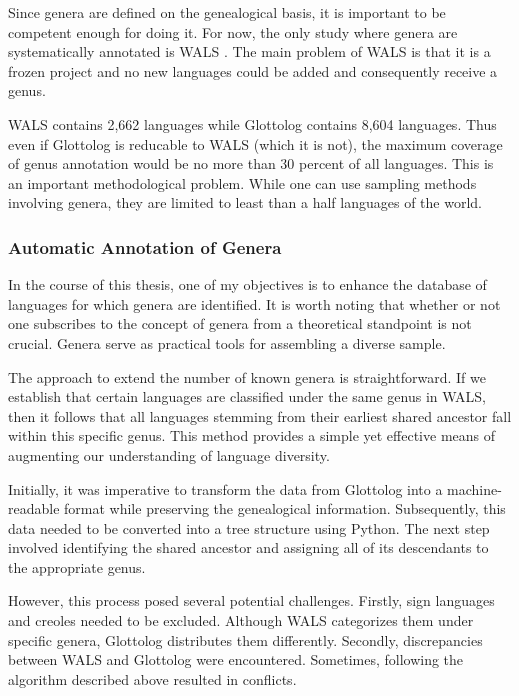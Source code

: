 Since genera are defined on the genealogical basis, it is important to be competent enough for doing it. For now, the only study where genera are systematically annotated is WALS \citep{wals}. The main problem of WALS is that it is a frozen project and no new languages could be added and consequently receive a genus.

WALS contains 2,662 languages while Glottolog \citep{hammarstrom2014glottolog} contains 8,604 languages. Thus even if Glottolog is reducable to WALS (which it is not), the maximum coverage of genus annotation would be no more than 30 percent of all languages. This is an important methodological problem. While one can use sampling methods involving genera, they are limited to least than a half languages of the world.

\subsubsection{Automatic Annotation of Genera}

In the course of this thesis, one of my objectives is to enhance the database of languages for which genera are identified. It is worth noting that whether or not one subscribes to the concept of genera from a theoretical standpoint is not crucial. Genera serve as practical tools for assembling a diverse sample.

The approach to extend the number of known genera is straightforward. If we establish that certain languages are classified under the same genus in WALS, then it follows that all languages stemming from their earliest shared ancestor fall within this specific genus. This method provides a simple yet effective means of augmenting our understanding of language diversity.

Initially, it was imperative to transform the data from Glottolog into a machine-readable format while preserving the genealogical information. Subsequently, this data needed to be converted into a tree structure using Python. The next step involved identifying the shared ancestor and assigning all of its descendants to the appropriate genus.

However, this process posed several potential challenges. Firstly, sign languages and creoles needed to be excluded. Although WALS categorizes them under specific genera, Glottolog distributes them differently. Secondly, discrepancies between WALS and Glottolog were encountered. Sometimes, following the algorithm described above resulted in conflicts.

